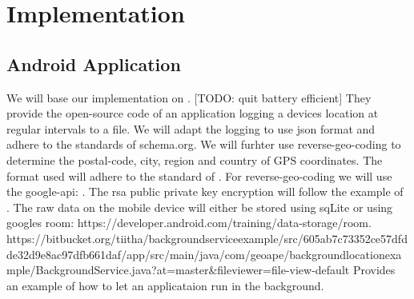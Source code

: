 \section{Implementation}
\subsection{Android Application}
We will base our implementation on \cite{gpsLogger}. [TODO: quit battery efficient] They provide the open-source code of an application logging a devices location at regular intervals to a file. We will adapt the logging to use json format and adhere to the standards of schema.org. We will furhter use reverse-geo-coding to determine the postal-code, city, region and country of GPS coordinates. The format used will adhere to the standard of \cite{schemaOrg}. For reverse-geo-coding we will use the google-api: \cite{googleApiReverseGeo}. The rsa public private key encryption will follow the example of \cite{rsa}. The raw data on the mobile device will either be stored using sqLite or using googles room: https://developer.android.com/training/data-storage/room. https://bitbucket.org/tiitha/backgroundserviceexample/src/605ab7c73352ce57dfdde32d9e8ac97dfb661daf/app/src/main/java/com/geoape/backgroundlocationexample/BackgroundService.java?at=master&fileviewer=file-view-default Provides an example of how to let an applicataion run in the background.